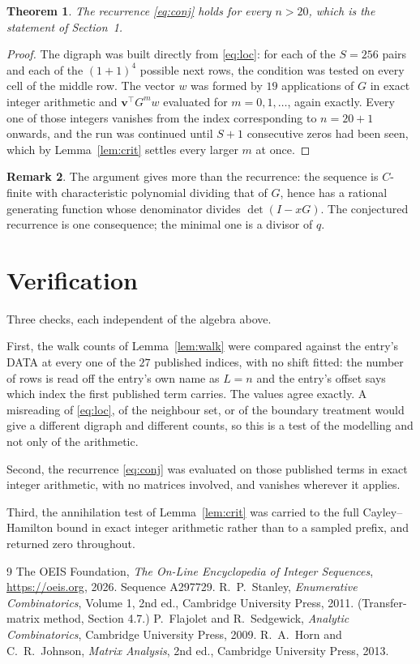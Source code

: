 \documentclass[11pt,a4paper]{article}
\theoremstyle{plain}
\newtheorem{theorem}{Theorem}
\theoremstyle{definition}
\newtheorem{remark}[theorem]{Remark}
\begin{document}
\begin{theorem}
The recurrence \eqref{eq:conj} holds for every $n>20$, which is the statement of
Section~1.
\end{theorem}

\begin{proof}
The digraph was built directly from \eqref{eq:loc}: for each of the $S=256$ pairs and each
of the $(1+1)^{4}$ possible next rows, the condition was tested on every cell of
the middle row. The vector $w$ was formed by $19$ applications of $G$ in exact integer
arithmetic and $\mathbf{v}^{\!\top}G^{m}w$ evaluated for $m=0,1,\dots$, again exactly.
Every one of those integers vanishes from the index corresponding to $n=20+1$ onwards,
and the run was continued until $S+1$ consecutive zeros had been seen, which by
Lemma~\ref{lem:crit} settles every larger $m$ at once.
\end{proof}

\begin{remark}
The argument gives more than the recurrence: the sequence is $C$-finite with characteristic
polynomial dividing that of $G$, hence has a rational generating function whose denominator
divides $\det(I-xG)$. The conjectured recurrence is one consequence; the minimal one is a
divisor of $q$.
\end{remark}

\section{Verification}

Three checks, each independent of the algebra above.

First, the walk counts of Lemma~\ref{lem:walk} were compared against the entry's DATA at
every one of the $27$ published indices, with no shift fitted: the number of rows is
read off the entry's own name as $L=n$ and the entry's offset says which index the first
published term carries. The values agree exactly. A misreading of \eqref{eq:loc}, of the
neighbour set, or of the boundary treatment would give a different digraph and different
counts, so this is a test of the modelling and not only of the arithmetic.

Second, the recurrence \eqref{eq:conj} was evaluated on those published terms in exact
integer arithmetic, with no matrices involved, and vanishes wherever it applies.

Third, the annihilation test of Lemma~\ref{lem:crit} was carried to the full
Cayley--Hamilton bound in exact integer arithmetic rather than to a sampled prefix, and
returned zero throughout.

\begin{thebibliography}{9}
 The OEIS Foundation, \emph{The On-Line Encyclopedia of Integer
Sequences}, \url{https://oeis.org}, 2026. Sequence A297729.
 R.~P.~Stanley, \emph{Enumerative Combinatorics}, Volume 1, 2nd ed.,
Cambridge University Press, 2011. (Transfer-matrix method, Section 4.7.)
 P.~Flajolet and R.~Sedgewick, \emph{Analytic Combinatorics}, Cambridge
University Press, 2009.
 R.~A.~Horn and C.~R.~Johnson, \emph{Matrix Analysis}, 2nd ed., Cambridge
University Press, 2013.
\end{thebibliography}
\end{document}
